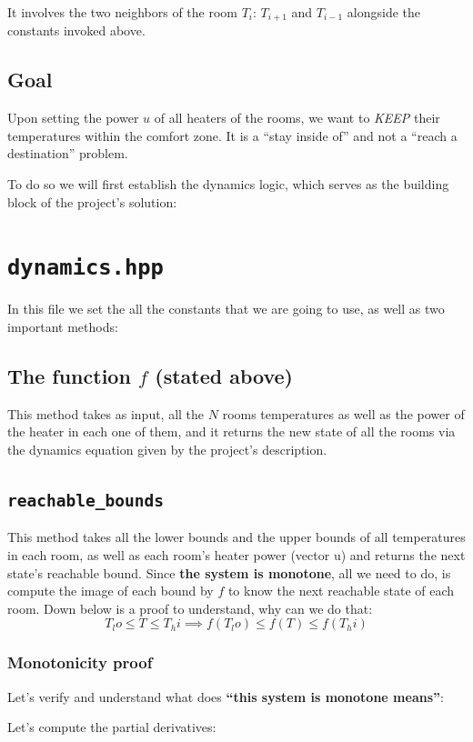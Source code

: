 \documentclass[11pt,a4paper]{article}
\begin{document}
It involves the two neighbors of the room $T_i$: $T_{i+1}$ and $T_{i-1}$ alongside the constants invoked above.

\subsection{Goal}
Upon setting the power $u$ of all heaters of the rooms, we want to \emph{KEEP} their temperatures within the comfort zone. It is a ``stay inside of'' and not a ``reach a destination'' problem.

To do so we will first establish the dynamics logic, which serves as the building block of the project's solution:

\section{\texttt{dynamics.hpp}}
In this file we set the all the constants that we are going to use, as well as two important methods:

\subsection{The function $f$ (stated above)}
This method takes as input, all the $N$ rooms temperatures as well as the power of the heater in each one of them, and it returns the new state of all the rooms via the dynamics equation given by the project's description.


\subsection{\texttt{reachable\_bounds}}
This method takes all the lower bounds and the upper bounds of all temperatures in each room, as well as each room's heater power (vector u) and returns the next state's reachable bound. Since \textbf{the system is monotone}, all we need to do, is compute the image of each bound by $f$ to know the next reachable state of each room. Down below is a proof to understand, why can we do that:
\[T_lo \le T \le T_hi \implies f(T_lo) \le f(T) \le f(T_hi)\]

\subsubsection{Monotonicity proof}
Let's verify and understand what does \textbf{``this system is monotone means''}:

Let's compute the partial derivatives:
\end{document}
